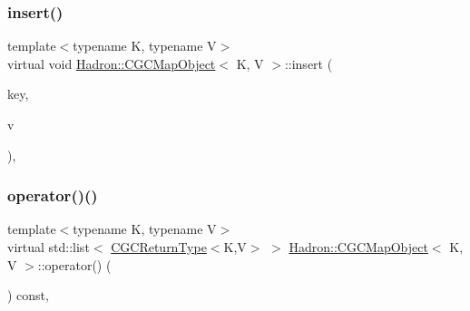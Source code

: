\mbox{\label{classHadron_1_1CGCMapObject_a334a88a21755a64719b1081190d2bde2}} 
\subsubsection{\texorpdfstring{insert()}{insert()}\hspace{0.1cm}{\footnotesize\ttfamily [2/2]}}
{\footnotesize\ttfamily template$<$typename K, typename V$>$ \\
virtual void \mbox{\hyperlink{classHadron_1_1CGCMapObject}{Hadron\+::\+C\+G\+C\+Map\+Object}}$<$ K, V $>$\+::insert (\begin{DoxyParamCaption}\item[{const \mbox{\hyperlink{structHadron_1_1CGCKeyType}{C\+G\+C\+Key\+Type}}$<$ K $>$ \&}]{key,  }\item[{const V \&}]{v }\end{DoxyParamCaption})\hspace{0.3cm}{\ttfamily [inline]}, {\ttfamily [virtual]}}

\mbox{\label{classHadron_1_1CGCMapObject_aaa4b18e1a2845e16154cd434462c0779}} 
\subsubsection{\texorpdfstring{operator()()}{operator()()}\hspace{0.1cm}{\footnotesize\ttfamily [1/4]}}
{\footnotesize\ttfamily template$<$typename K, typename V$>$ \\
virtual std\+::list$<$ \mbox{\hyperlink{structHadron_1_1CGCReturnType}{C\+G\+C\+Return\+Type}}$<$K,V$>$ $>$ \mbox{\hyperlink{classHadron_1_1CGCMapObject}{Hadron\+::\+C\+G\+C\+Map\+Object}}$<$ K, V $>$\+::operator() (\begin{DoxyParamCaption}\item[{void}]{ }\end{DoxyParamCaption}) const\hspace{0.3cm}{\ttfamily [inline]}, {\ttfamily [virtual]}}



